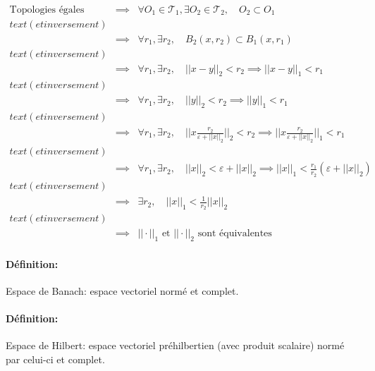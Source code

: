 \documentclass[a4paper, 11pt, french]{book}
\theoremstyle{plain} %
\theoremstyle{definition} %
\theoremstyle{remark} %
\newcommand{\1}{\mathds{1}}
\begin{document}
\fbox{$\Longleftarrow$}
$
	\begin{array}{rcl}
		\text{Topologies égales}
		  & \implies & \forall O_1\in\mathscr{T}_1, \exists O_2\in\mathscr{T}_2, \quad O_2\subset O_1                                                \\text{(et inversement)}\\
		  & \implies & \forall r_1, \exists r_2, \quad B_2(x, r_2)\subset B_1(x, r_1)                                                                \\text{(et inversement)}\\
		  & \implies & \forall r_1, \exists r_2, \quad ||x-y||_2<r_2\implies ||x-y||_1<r_1                                                           \\text{(et inversement)}\\
		  & \implies & \forall r_1, \exists r_2, \quad ||y||_2<r_2\implies ||y||_1<r_1                                                               \\text{(et inversement)}\\
		  & \implies & \forall r_1, \exists r_2, \quad ||x\frac{r_2}{\varepsilon+||x||_2}||_2<r_2\implies ||x\frac{r_2}{\varepsilon+||x||_2}||_1<r_1 \\text{(et inversement)}\\
		  & \implies & \forall r_1, \exists r_2, \quad ||x||_2<\varepsilon+||x||_2\implies ||x||_1<\frac{r_1}{r_2}(\varepsilon+||x||_2)              \\text{(et inversement)}\\
		  & \implies & \exists r_2, \quad ||x||_1 <\frac{1}{r_2}||x||_2                                                                              \\text{(et inversement)}\\
		  & \implies & \text{$|| \cdot||_1$ et $|| \cdot||_2$ sont équivalentes}
	\end{array}
$

\paragraph{Définition:} Espace de Banach: espace vectoriel normé et complet.
\paragraph{Définition:} Espace de Hilbert: espace vectoriel préhilbertien (avec produit scalaire) normé par celui-ci et complet.
\end{document}
